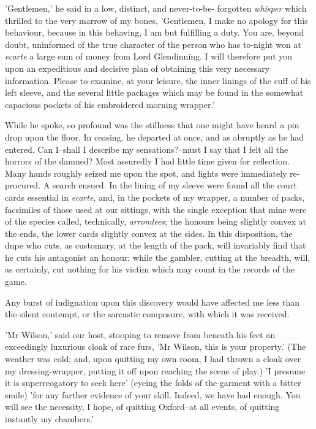 \documentclass[12pt]{article}
\begin{document}
     'Gentlemen,' he said in a low, distinct, and never-to-be-
forgotten \emph{whisper} which thrilled to the very marrow of my
bones, 'Gentlemen, I make no apology for this behaviour, because in
this behaving, I am but fulfilling a duty.  You are, beyond doubt,
uninformed of the true character of the person who has to-night won
at \emph{ecarte} a large sum of money from Lord Glendinning.  I 
will therefore put you upon an expeditious and decisive plan of
obtaining this very necessary information.  Please to examine, at
your leisure, the inner linings of the cuff of his left sleeve, and
the several little packages which may be found in the somewhat
capacious pockets of his embroidered morning wrapper.'

     While he spoke, so profound was the stillness that one might
have heard a pin drop upon the floor.  In ceasing, he departed at
once, and as abruptly as he had entered.  Can I--shall I describe
my sensations?--must I say that I felt all the horrors of the
damned?  Most assuredly I had little time given for reflection. 
Many hands roughly seized me upon the spot, and lights were
immediately re-procured.  A search ensued.  In the lining of my
sleeve were found all the court cards essential in \emph{ecarte}, and,
in the pockets of my wrapper, a number of packs, facsimiles of
those used at our sittings, with the single exception that mine
were of the species called, technically, \emph{arrondees}; the honours
being slightly convex at the ends, the lower cards slightly convex
at the sides.  In this disposition, the dupe who cuts, as
customary, at the length of the pack, will invariably find that he
cuts his antagonist an honour; while the gambler, cutting at the
breadth, will, as certainly, cut nothing for his victim which may
count in the records of the game.

     Any burst of indignation upon this discovery would have
affected me less than the silent contempt, or the sarcastic
composure, with which it was received.

     'Mr Wilson,' said our host, stooping to remove from beneath
his feet an exceedingly luxurious cloak of rare furs, 'Mr Wilson,
this is your property.'  (The weather was cold; and, upon quitting
my own room, I had thrown a cloak over my dressing-wrapper, putting
it off upon reaching the scene of play.)  'I presume it is
superreogatory to seek here' (eyeing the folds of the garment with
a bitter smile) 'for any farther evidence of your skill.  Indeed,
we have had enough.  You will see the necessity, I hope, of
quitting Oxford--at all events, of quitting instantly my chambers.'
\end{document}
